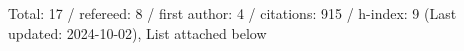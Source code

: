 Total: 17 / refereed: 8 / first author: 4 / citations: 915 / h-index: 9 (Last updated: 2024-10-02), List attached below